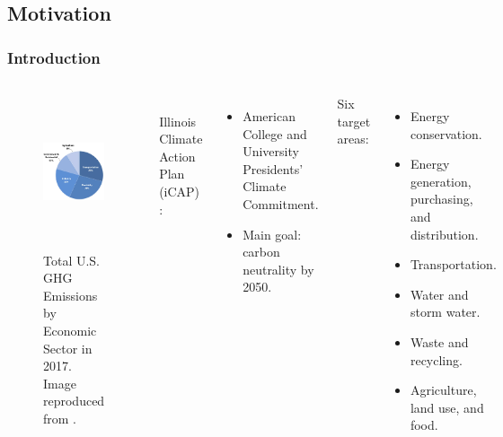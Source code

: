 \subsection{Motivation}
\begin{frame}
\frametitle{Introduction}
\begin{columns}
    \column[t]{4.5cm}
	\begin{figure}[htbp!]
		\begin{center}
			\includegraphics[height=4.5cm]{images/total-ghg-2017.png}
		\end{center}
		\caption{Total U.S. GHG Emissions by Economic Sector in 2017. Image reproduced from \cite{us_epa_sources_2020}.}
	\end{figure}

	\column[t]{5.5cm}
	\\
	Illinois Climate Action Plan (iCAP) \cite{isee_illinois_2015}:
	\begin{itemize}
		\item American College and University Presidents’ Climate Commitment.
		\item Main goal: carbon neutrality by 2050.
	\end{itemize}
	\vspace{0.5cm}
	Six target areas:
	\begin{itemize}
		\item Energy conservation.
		\item Energy generation, purchasing, and distribution.
		\item Transportation.
		\item Water and storm water.
		\item Waste and recycling.
		\item Agriculture, land use, and food.
	\end{itemize}
\end{columns}
\end{frame}


